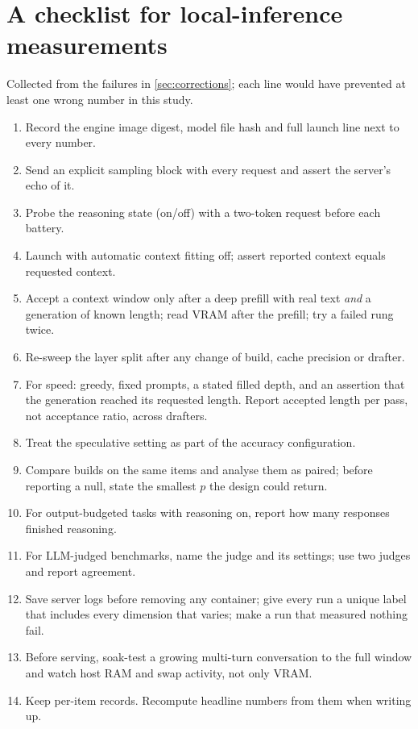 \section{A checklist for local-inference measurements}\label{app:checklist}
Collected from the failures in \cref{sec:corrections}; each line would have prevented at least one
wrong number in this study.
\begin{enumerate}
\item Record the engine image digest, model file hash and full launch line next to every number.
\item Send an explicit sampling block with every request and assert the server's echo of it.
\item Probe the reasoning state (on/off) with a two-token request before each battery.
\item Launch with automatic context fitting off; assert reported context equals requested context.
\item Accept a context window only after a deep prefill with real text \emph{and} a generation of
known length; read VRAM after the prefill; try a failed rung twice.
\item Re-sweep the layer split after any change of build, cache precision or drafter.
\item For speed: greedy, fixed prompts, a stated filled depth, and an assertion that the generation
reached its requested length. Report accepted length per pass, not acceptance ratio, across drafters.
\item Treat the speculative setting as part of the accuracy configuration.
\item Compare builds on the same items and analyse them as paired; before reporting a null, state the
smallest $p$ the design could return.
\item For output-budgeted tasks with reasoning on, report how many responses finished reasoning.
\item For LLM-judged benchmarks, name the judge and its settings; use two judges and report agreement.
\item Save server logs before removing any container; give every run a unique label that includes every
dimension that varies; make a run that measured nothing fail.
\item Before serving, soak-test a growing multi-turn conversation to the full window and watch host RAM
and swap activity, not only VRAM.
\item Keep per-item records. Recompute headline numbers from them when writing up.
\end{enumerate}
